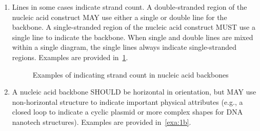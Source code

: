 \begin{enumerate}
\item Lines in some cases indicate strand count. 
	A double-stranded region of the nucleic acid construct MAY use either a single or double line for the backbone.  
	A single-stranded region of the nucleic acid construct MUST use a single line to indicate the backbone.
	When single and double lines are mixed within a single diagram, the single lines always indicate single-stranded regions.
	Examples are provided in~\ref{exa:1a}.
	
	\begin{figure}[h!]
	\centering
	\caption{Examples of indicating strand count in nucleic acid backbones}
	\label{exa:1a}
	\end{figure}
		
\item A nucleic acid backbone SHOULD be horizontal in orientation, 
	but MAY use non-horizontal structure to indicate important physical attributes 
	(e.g., a closed loop to indicate a cyclic plasmid or more complex shapes for DNA nanotech structures).   
	Examples are provided in~\ref{exa:1b}.
	

\end{enumerate}
